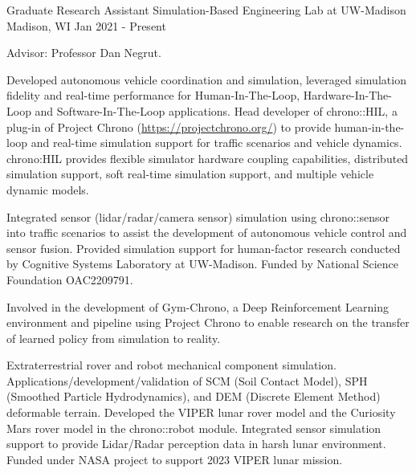 

\begin{cventries}
	
  \cventry
	{Graduate Research Assistant} %
	{Simulation-Based Engineering Lab at UW-Madison} %
	{Madison, WI} %
	{Jan 2021 - Present} %
	{
		\begin{cvitems} %
			\item {Advisor: Professor Dan Negrut.}
			\item {Developed autonomous vehicle coordination and simulation, leveraged simulation fidelity and real-time performance for Human-In-The-Loop, Hardware-In-The-Loop and Software-In-The-Loop applications. Head developer of chrono::HIL, a plug-in of Project Chrono (\url{https://projectchrono.org/}) to provide human-in-the-loop and real-time simulation support for traffic scenarios and vehicle dynamics. chrono:HIL provides flexible simulator hardware coupling capabilities, distributed simulation support, soft real-time simulation support, and multiple vehicle dynamic models.} 
			\item {Integrated sensor (lidar/radar/camera sensor) simulation using chrono::sensor into traffic scenarios to assist the development of autonomous vehicle control and sensor fusion. Provided simulation support for human-factor research conducted by Cognitive Systems Laboratory at UW-Madison. Funded by National Science Foundation OAC2209791.}
			\item {Involved in the development of Gym-Chrono, a Deep Reinforcement Learning environment and pipeline using Project Chrono to enable research on the transfer of learned policy from simulation to reality.}
			\item {Extraterrestrial rover and robot mechanical component simulation. Applications/development/validation of SCM (Soil Contact Model), SPH (Smoothed Particle Hydrodynamics), and DEM (Discrete Element Method) deformable terrain. Developed the VIPER lunar rover model and the Curiosity Mars rover model in the chrono::robot module. Integrated sensor simulation support to provide Lidar/Radar perception data in harsh lunar environment. Funded under NASA project to support 2023 VIPER lunar mission.}
		\end{cvitems}
	}


\end{cventries}

